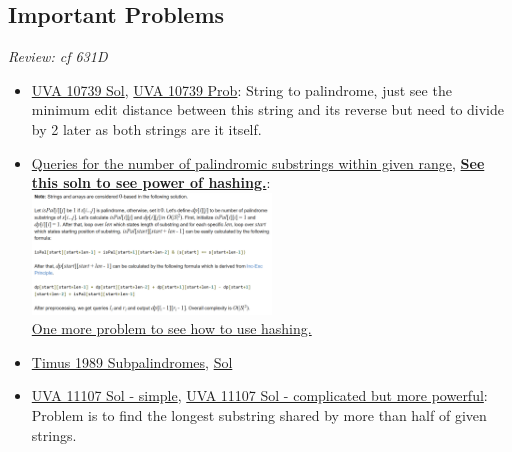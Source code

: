\documentclass[8pt, a4paper, oneside, twocolumn]{extarticle}
\begin{document}
\subsection{Important Problems}
\textit{Review: cf 631D}
\begin{itemize}
	\item \href {https://github.com/sourabh2311/Competitive-Programming/blob/master/UVA_10739.cpp}{UVA 10739 Sol}, \href {https://uva.onlinejudge.org/external/107/10739.pdf}{UVA 10739 Prob}: String to palindrome, just see the minimum edit distance between this string and its reverse but need to divide by 2 later as both strings are it itself.	
	\item \href {https://codeforces.com/contest/245/problem/H}{Queries for the number of palindromic substrings within given range}, \href {https://github.com/sourabh2311/Competitive-Programming/blob/master/IMP%20QUES/Suffix%20String%20Structure/Hash/245H%20-%20Queries%20for%20Number%20of%20Palindromes.cpp}{\textbf {See this soln to see power of hashing.}}: 
    \\\includegraphics[width=0.5\textwidth,height=0.5\textheight,keepaspectratio]{palsub} 	
    \\\href {https://github.com/sourabh2311/Competitive-Programming/blob/master/IMP%20QUES/Suffix%20String%20Structure/Hash/514C%20-%20Watto%20And%20Mechanism.cpp}{One more problem to see how to use hashing.}
    \item \href{http://acm.timus.ru/problem.aspx?space=1&num=1989}{Timus 1989 Subpalindromes}, \href{https://github.com/sourabh2311/Competitive-Programming/blob/master/timus/1989.cpp}{Sol}
	\item \href {https://github.com/sourabh2311/Competitive-Programming/blob/master/HimanshuSA11107.cpp}{UVA 11107 Sol - simple}, \href {https://github.com/sourabh2311/Competitive-Programming/blob/master/HimanshuSA11107.cpp}{UVA 11107 Sol - complicated but more powerful}: Problem is to find the longest substring shared by more than half of given strings.	
\end{itemize}
\end{document}
